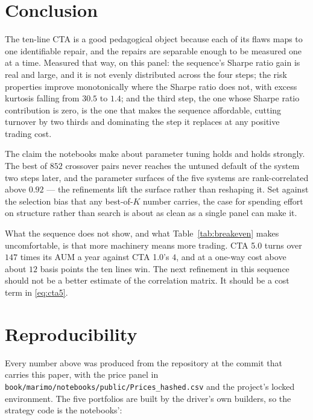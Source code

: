 \documentclass[11pt,a4paper]{article}
\newcommand{\code}[1]{\texttt{#1}}
\begin{document}
\section{Conclusion}

The ten-line CTA is a good pedagogical object because each of its flaws maps
to one identifiable repair, and the repairs are separable enough to be
measured one at a time. Measured that way, on this panel: the sequence's Sharpe
ratio gain is real and large, and it is not evenly distributed across the four
steps; the risk properties improve monotonically where the Sharpe ratio does
not, with excess kurtosis falling from $30.5$ to $1.4$; and the third step, the
one whose Sharpe ratio contribution is zero, is the one that makes the
sequence affordable, cutting turnover by two thirds and dominating the step it
replaces at any positive trading cost.

The claim the notebooks make about parameter tuning holds and holds strongly.
The best of $852$ crossover pairs never reaches the untuned default of the
system two steps later, and the parameter surfaces of the five systems are
rank-correlated above $0.92$ --- the refinements lift the surface rather than
reshaping it. Set against the selection bias that any best-of-$K$ number
carries, the case for spending effort on structure rather than search is about
as clean as a single panel can make it.

What the sequence does not show, and what Table~\ref{tab:breakeven} makes
uncomfortable, is that more machinery means more trading. CTA 5.0 turns over
$147$ times its AUM a year against CTA 1.0's $4$, and at a one-way cost above
about $12$ basis points the ten lines win. The next refinement in this
sequence should not be a better estimate of the correlation matrix. It should
be a cost term in \eqref{eq:cta5}.

\appendix

\section{Reproducibility}
\label{app:repro}

Every number above was produced from the repository at the commit that carries
this paper, with the price panel in
\code{book/marimo/notebooks/public/Prices\_hashed.csv} and the project's
locked environment. The five portfolios are built by the driver's own
builders, so the strategy code is the notebooks':
\end{document}
